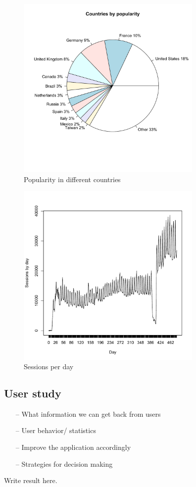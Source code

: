 \begin{figure}[htb]
\centering \includegraphics[height=9cm]{charts/country_popularity}
\caption{Popularity in different countries \label{user_country}}
\end{figure}


\begin{figure}[htb]
\centering \includegraphics[height=9cm]{charts/sessions_per_day}
\caption{Sessions per day \label{sessions_perday}}
\end{figure}

\subsection{User study}
\begin{itemize}
\item[--]What information we can get back from users
\item[--]User behavior/ statistics
\item[--]Improve the application accordingly
\item[--]Strategies for decision making
\end{itemize}
Write result here.